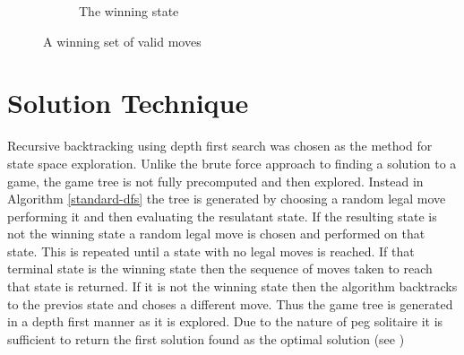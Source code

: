 \documentclass[12pt,a4paper]{report}
\begin{document}
\begin{figure}[ht]
\begin{subfigure}[t]{0.3\textwidth}
{      
    }
    \caption{The winning state}
  \end{subfigure}
  \caption{A winning set of valid moves}
\end{figure}
\pagebreak
\section*{Solution Technique}
Recursive backtracking using depth first search was chosen as the method for state space exploration. Unlike the brute force approach to finding a solution to a game, the game tree is not fully precomputed and then explored. Instead in Algorithm \ref{standard-dfs} the tree is generated by choosing a random legal move performing it and then evaluating the resulatant state. If the resulting state is not the winning state a random legal move is chosen and performed on that state. This is repeated until a state with no legal moves is reached. If that terminal state is the winning state then the sequence of moves taken to reach that state is returned. If it is not the winning state then the algorithm backtracks to the previos state and choses a different move. Thus the game tree is generated in a depth first manner as it is explored. Due to the nature of peg solitaire it is sufficient to return the first solution found as the optimal solution (see )
\end{document}
